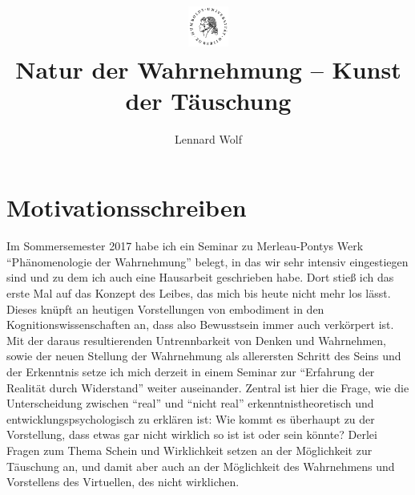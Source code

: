 \documentclass[a4paper]{article}
\date{\vspace{-3ex}}
\begin{document}
\title{
    \vspace{-30pt}
	\includegraphics*[width=0.1\textwidth,right]{ErstesSem/images/hu_logo2.png}\\
	\vspace{-10pt}
	Natur der Wahrnehmung – Kunst der Täuschung}
\author{Lennard Wolf}%
\maketitle
\vspace{-4pt}

\section*{Motivationsschreiben}
\normalsize Im Sommersemester 2017 habe ich ein Seminar zu Merleau-Pontys Werk "`Phänomenologie der Wahrnehmung"' belegt, in das wir sehr intensiv eingestiegen sind und zu dem ich auch eine Hausarbeit geschrieben habe. Dort stieß ich das erste Mal auf das Konzept des Leibes, das mich bis heute nicht mehr los lässt. Dieses knüpft an heutigen Vorstellungen von embodiment in den Kognitionswissenschaften an, dass also Bewusstsein immer auch verkörpert ist. Mit der daraus resultierenden Untrennbarkeit von Denken und Wahrnehmen, sowie der neuen Stellung der Wahrnehmung als allerersten Schritt des Seins und der Erkenntnis setze ich mich derzeit in einem Seminar zur “Erfahrung der Realität durch Widerstand” weiter auseinander. Zentral ist hier die Frage, wie die Unterscheidung zwischen “real” und “nicht real” erkenntnistheoretisch und entwicklungspsychologisch zu erklären ist: Wie kommt es überhaupt zu der Vorstellung, dass etwas gar nicht wirklich so ist ist oder sein könnte? Derlei Fragen zum Thema Schein und Wirklichkeit setzen an der Möglichkeit zur Täuschung an, und damit aber auch an der Möglichkeit des Wahrnehmens und Vorstellens des Virtuellen, des nicht wirklichen. 
\end{document}
